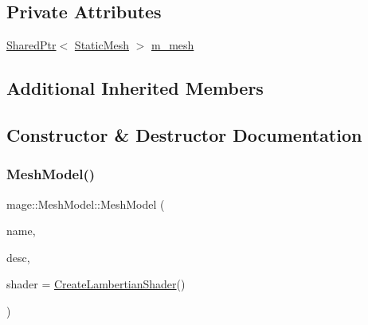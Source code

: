 \subsection*{Private Attributes}
\begin{DoxyCompactItemize}
\item 
\hyperlink{namespacemage_a1e01ae66713838a7a67d30e44c67703e}{Shared\+Ptr}$<$ \hyperlink{classmage_1_1_static_mesh}{Static\+Mesh} $>$ \hyperlink{classmage_1_1_mesh_model_a938e3a83fa927b2427212bd2e397aa87}{m\+\_\+mesh}
\end{DoxyCompactItemize}
\subsection*{Additional Inherited Members}


\subsection{Constructor \& Destructor Documentation}
\hypertarget{classmage_1_1_mesh_model_ab340d6b0791d737e6f632422390f0ae1}{}\label{classmage_1_1_mesh_model_ab340d6b0791d737e6f632422390f0ae1} 
\subsubsection{\texorpdfstring{Mesh\+Model()}{MeshModel()}\hspace{0.1cm}{\footnotesize\ttfamily [1/3]}}
{\footnotesize\ttfamily mage\+::\+Mesh\+Model\+::\+Mesh\+Model (\begin{DoxyParamCaption}\item[{const string \&}]{name,  }\item[{const \hyperlink{classmage_1_1_model_descriptor}{Model\+Descriptor} \&}]{desc,  }\item[{const \hyperlink{structmage_1_1_combined_shader}{Combined\+Shader} \&}]{shader = {\ttfamily \hyperlink{namespacemage_ab0bd21012fa29244f0f9b3201bebc2a5}{Create\+Lambertian\+Shader}()} }\end{DoxyParamCaption})\hspace{0.3cm}{\ttfamily [explicit]}}

\hypertarget{classmage_1_1_mesh_model_a60bdd36ff7a0713f82b60287d9a8568c}{}\label{classmage_1_1_mesh_model_a60bdd36ff7a0713f82b60287d9a8568c} 
